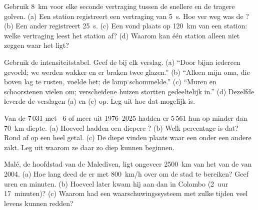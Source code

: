 \begin{exercise}[$\star\star$]\label{exo:g7:earthquakes:7}
Gebruik \qty{8}{km} voor elke seconde vertraging tussen de snellere en de
tragere golven. (a) Een station registreert een vertraging van \qty{5}{s}.
Hoe ver weg was de ? (b) Een ander registreert \qty{25}{s}.
(c) Een  vond plaats op \qty{120}{km} van een station: welke
vertraging leest het station af? (d) Waarom kan één station alleen niet
zeggen waar het  ligt?
\end{exercise}

\begin{exercise}[$\star\star$]\label{exo:g7:earthquakes:8}
Gebruik de intensiteitstabel. Geef de  bij elk verslag. (a)
``Door bijna iedereen gevoeld; we werden wakker en er braken twee glazen.''
(b) ``Alleen mijn oma, die boven lag te rusten, voelde het; de lamp
schommelde.'' (c) ``Muren en schoorstenen vielen om; verscheidene huizen
stortten gedeeltelijk in.'' (d) Dezelfde  leverde de verslagen
(a) en (c) op. Leg uit hoe dat mogelijk is.
\end{exercise}

\begin{exercise}[$\star\star$]\label{exo:g7:earthquakes:9}
Van de 7\,031  met ~6 of meer uit 1976--2025 hadden
er 5\,561 hun  op minder dan \qty{70}{km} diepte. (a) Hoeveel hadden
een diepere ? (b) Welk percentage is dat? Rond af op een heel getal.
(c) De diepe vinden plaats waar een  onder een andere zakt. Leg uit
waarom ze daar zo diep kunnen beginnen.
\end{exercise}

\begin{exercise}[$\star\star$]\label{exo:g7:earthquakes:10}
Malé, de hoofdstad van de Malediven, ligt ongeveer \qty{2500}{km} van het
 van de  van 2004. (a) Hoe lang deed de  er met
\qty{800}{km/h} over om de stad te bereiken? Geef uren en minuten.
(b) Hoeveel later kwam hij aan dan in Colombo (2~uur 17~minuten)?
(c) Waarom had een waarschuwingssysteem met zulke tijden veel levens kunnen
redden?
\end{exercise}

